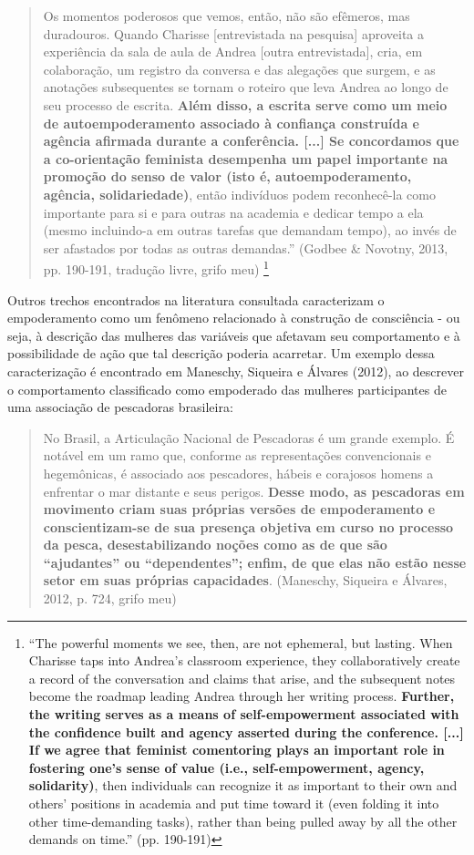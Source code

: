 \begin{quote}
    Os momentos poderosos que vemos, então, não são efêmeros, mas duradouros. Quando Charisse [entrevistada na pesquisa] aproveita a experiência da sala de aula de Andrea [outra entrevistada], cria, em colaboração, um registro da conversa e das alegações que surgem, e as anotações subsequentes se tornam o roteiro que leva Andrea ao longo de seu processo de escrita. \textbf{Além disso, a escrita serve como um meio de autoempoderamento associado à confiança construída e agência afirmada durante a conferência. [...] Se concordamos que a co-orientação feminista desempenha um papel importante na promoção do senso de valor (isto é, autoempoderamento, agência, solidariedade)}, então indivíduos podem reconhecê-la como importante para si e para outras na academia e dedicar tempo a ela (mesmo incluindo-a em outras tarefas que demandam tempo), ao invés de ser afastados por todas as outras demandas.” (Godbee \& Novotny, 2013, pp. 190-191, tradução livre, grifo meu) \footnote{“The powerful moments we see, then, are not ephemeral, but lasting. When Charisse taps into Andrea’s classroom experience, they collaboratively create a record of the conversation and claims that arise, and the subsequent notes become the roadmap leading Andrea through her writing process. \textbf{Further, the writing serves as a means of self-empowerment associated with the confidence built and agency asserted during the conference. [...] If we agree that feminist comentoring plays an important role in fostering one’s sense of value (i.e., self-empowerment, agency, solidarity)}, then individuals can recognize it as important to their own and others’ positions in academia and put time toward it (even folding it into other time-demanding tasks), rather than being pulled away by all the other demands on time.” (pp. 190-191)}
\end{quote}

Outros trechos encontrados na literatura consultada caracterizam o empoderamento como um fenômeno relacionado à construção de consciência - ou seja, à descrição das mulheres das variáveis que afetavam seu comportamento e à possibilidade de ação que tal descrição poderia acarretar. Um exemplo dessa caracterização é encontrado em Maneschy, Siqueira e Álvares (2012), ao descrever o comportamento classificado como empoderado das mulheres participantes de uma associação de pescadoras brasileira:

\begin{quote}
    No Brasil, a Articulação Nacional de Pescadoras é um grande exemplo. É notável em um ramo que, conforme as representações convencionais e hegemônicas, é associado aos pescadores, hábeis e corajosos homens a enfrentar o mar distante e seus perigos. \textbf{Desse modo, as pescadoras em movimento criam suas próprias versões de empoderamento e conscientizam-se de sua presença objetiva em curso no processo da pesca, desestabilizando noções como as de que são “ajudantes” ou “dependentes”; enfim, de que elas não estão nesse setor em suas próprias capacidades}. (Maneschy, Siqueira e Álvares, 2012, p. 724, grifo meu)
\end{quote}

